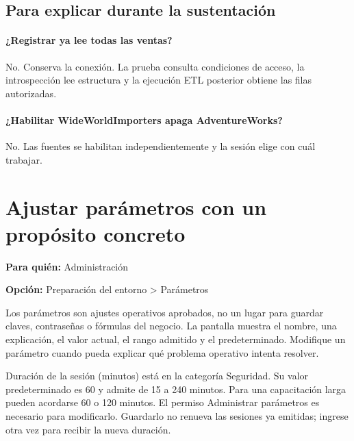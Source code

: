 \subsection{Para explicar durante la sustentación}
\paragraph{¿Registrar ya lee todas las ventas?} No. Conserva la conexión. La prueba consulta condiciones de acceso, la introspección lee estructura y la ejecución ETL posterior obtiene las filas autorizadas.

\paragraph{¿Habilitar WideWorldImporters apaga AdventureWorks?} No. Las fuentes se habilitan independientemente y la sesión elige con cuál trabajar.


\section{Ajustar parámetros con un propósito concreto}
\label{unidad:operacion_10}
\textbf{Para quién:} Administración\par
\textbf{Opción:} Preparación del entorno > Parámetros\par

Los parámetros son ajustes operativos aprobados, no un lugar para guardar claves, contraseñas o fórmulas del negocio. La pantalla muestra el nombre, una explicación, el valor actual, el rango admitido y el predeterminado. Modifique un parámetro cuando pueda explicar qué problema operativo intenta resolver.

Duración de la sesión (minutos) está en la categoría Seguridad. Su valor predeterminado es 60 y admite de 15 a 240 minutos. Para una capacitación larga pueden acordarse 60 o 120 minutos. El permiso Administrar parámetros es necesario para modificarlo. Guardarlo no renueva las sesiones ya emitidas; ingrese otra vez para recibir la nueva duración.

